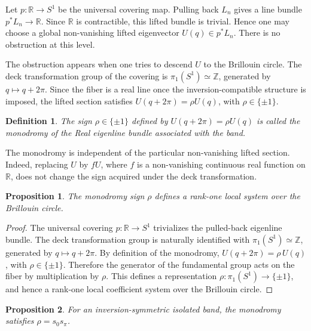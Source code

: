 \documentclass[preprint,12pt]{elsarticle}
\newtheorem{prop}{Proposition}
\newtheorem{definition}{Definition}
\newtheorem{proof}{Proof}
\begin{document}
Let $p:\mathbb R\longrightarrow S^1$ be the universal covering map. Pulling back $L_n$ gives a line bundle $p^*L_n\longrightarrow \mathbb R$. Since $\mathbb R$ is contractible, this lifted bundle is trivial. Hence one may choose a global non-vanishing lifted eigenvector $U(q)\in p^*L_n$.
There is no obstruction at this level.

The obstruction appears when one tries to descend $U$ to the Brillouin circle. The deck transformation group of the covering is
$\pi_1(S^1)\simeq\mathbb Z$,
generated by $q\longmapsto q+2\pi$.
Since the fiber is a real line once the inversion-compatible structure is imposed, the lifted section satisfies
$U(q+2\pi)=\rho U(q)$, with $\rho\in \{\pm1 \}$.

\begin{definition}
The sign $\rho\in \{\pm1\}$ defined by $U(q+2\pi)=\rho U(q)$ is called the monodromy of the Real eigenline bundle associated with the band.
\end{definition}

The monodromy is independent of the particular non-vanishing lifted section. Indeed, replacing $U$ by $fU$, where $f$ is a non-vanishing continuous real function on $\mathbb R$, does not change the sign acquired under the deck transformation.

\begin{prop}
The monodromy sign $\rho$ defines a rank-one local system over the Brillouin circle.
\end{prop}

\begin{proof}
The universal covering $p:\mathbb R\rightarrow S^1$ trivializes the pulled-back eigenline bundle. The deck transformation group is naturally identified with $\pi_1(S^1)\simeq\mathbb Z$, generated by $q\mapsto q+2\pi$. By definition of the monodromy, $U(q+2\pi)=\rho\,U(q)$, with $\rho\in \{\pm1\}$.
Therefore the generator of the fundamental group acts on the fiber by multiplication by $\rho$. This defines a representation $\rho:\pi_1(S^1)\rightarrow \{\pm1 \}$, and hence a rank-one local coefficient system over the Brillouin circle.
\end{proof}

\begin{prop}
For an inversion-symmetric isolated band, the monodromy satisfies $\rho=s_0s_\pi$.
\end{prop}
\end{document}
